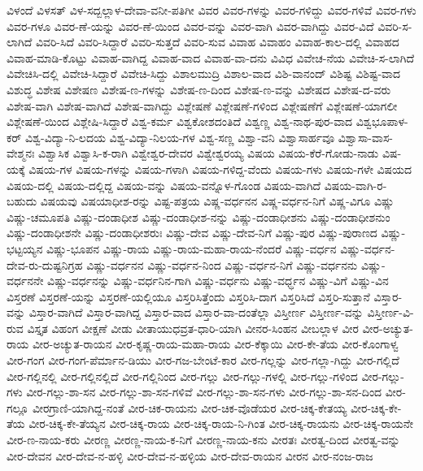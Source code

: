 {ವಿಳಂದೆ
ವಿಳಸತ್
ವಿಳ-ಸದ್ಬಲ್ಲಾಳ-ದೇವಾ-ವನೀ-ಪತಿಗೀ
ವಿವರ
ವಿವರ-ಗಳನ್ನು
ವಿವರ-ಗಳಿದ್ದು
ವಿವರ-ಗಳಿವೆ
ವಿವರ-ಗಳು
ವಿವರ-ಗಳೂ
ವಿವರ-ಣೆ-ಯನ್ನು
ವಿವರ-ಣೆ-ಯಿಂದ
ವಿವರ-ವನ್ನು
ವಿವರ-ವಾಗಿ
ವಿವರ-ವಾಗಿದ್ದು
ವಿವರ-ವಿದೆ
ವಿವರಿ-ಸ-ಲಾಗಿದೆ
ವಿವರಿ-ಸಿದೆ
ವಿವರಿ-ಸಿದ್ದಾರೆ
ವಿವರಿ-ಸುತ್ತದೆ
ವಿವರಿ-ಸುವ
ವಿವಾಹ
ವಿವಾಹಂ
ವಿವಾಹ-ಕಾಲ-ದಲ್ಲಿ
ವಿವಾಹದ
ವಿವಾಹ-ಮಾಡಿ-ಕೊಟ್ಟು
ವಿವಾಹ-ವಾಗಿದ್ದ
ವಿವಾಹ-ವಾದ
ವಿವಾಹ-ವಾ-ದನು
ವಿವಿಧ
ವಿವೇಚ-ನೆಯ
ವಿವೇಚಿ-ಸ-ಲಾಗಿದೆ
ವಿವೇಚಿಸಿ-ದಲ್ಲಿ
ವಿವೇಚಿ-ಸಿದ್ದಾರೆ
ವಿವೇಚಿ-ಸಿದ್ದು
ವಿಶಾಲಮುದ್ರಿ
ವಿಶಾಲ-ವಾದ
ವಿಶಿ-ವಾನಂದ್
ವಿಶಿಷ್ಟ
ವಿಶಿಷ್ಟ-ವಾದ
ವಿಶುದ್ಧ
ವಿಶೇಷ
ವಿಶೇಷಣ
ವಿಶೇಷ-ಣ-ಗಳನ್ನು
ವಿಶೇಷ-ಣ-ದಿಂದ
ವಿಶೇಷ-ಣ-ವನ್ನು
ವಿಶೇಷದ
ವಿಶೇಷ-ದ-ವರು
ವಿಶೇಷ-ವಾಗಿ
ವಿಶೇಷ-ವಾಗಿದೆ
ವಿಶೇಷ-ವಾಗಿದ್ದು
ವಿಶ್ಲೇಷಣೆ
ವಿಶ್ಲೇಷಣೆ-ಗಳಿಂದ
ವಿಶ್ಲೇಷಣೆಗೆ
ವಿಶ್ಲೇಷಣೆ-ಯಾಗಲೀ
ವಿಶ್ಲೇಷಣೆ-ಯಿಂದ
ವಿಶ್ಲೇಷಿ-ಸಿದ್ದಾರೆ
ವಿಶ್ವ-ಕರ್ಮ
ವಿಶ್ವಕೋಶದಂತಿದೆ
ವಿಶ್ವಣ್ಣ
ವಿಶ್ವ-ನಾಥ-ಪುರ-ವಾದ
ವಿಶ್ವಭೂಪಾಳ-ಕರ್
ವಿಶ್ವ-ವಿದ್ಯಾ-ನಿ-ಲದಯ
ವಿಶ್ವ-ವಿದ್ಯಾ-ನಿಲಯ-ಗಳ
ವಿಶ್ವ-ಸಣ್ಣ
ವಿಶ್ವಾ-ವನಿ
ವಿಶ್ವಾಸಾರ್ಹವೂ
ವಿಶ್ವಾಸಾ-ವಾಸ-ವೇಶ್ಮನಃ
ವಿಶ್ವಾಸಿಕ
ವಿಶ್ವಾಸಿ-ಕ-ರಾಗಿ
ವಿಶ್ವೇಶ್ವರ-ದೇವರ
ವಿಶ್ವೇಶ್ವರಯ್ಯ
ವಿಷಯ
ವಿಷಯ-ಕೆರೆ-ಗೋಡು-ನಾಡು
ವಿಷ-ಯಕ್ಕೆ
ವಿಷಯ-ಗಳ
ವಿಷಯ-ಗಳನ್ನು
ವಿಷಯ-ಗಳಾಗಿ
ವಿಷಯ-ಗಳಿದ್ದ-ವೆಂದು
ವಿಷಯ-ಗಳು
ವಿಷಯ-ಗಳೇ
ವಿಷಯದ
ವಿಷಯ-ದಲ್ಲಿ
ವಿಷಯ-ದಲ್ಲಿದ್ದ
ವಿಷಯ-ವನ್ನು
ವಿಷಯ-ವನ್ನೊಳ-ಗೊಂಡ
ವಿಷಯ-ವಾಗಿದೆ
ವಿಷಯ-ವಾಗಿ-ರ-ಬಹುದು
ವಿಷಯವು
ವಿಷಯಾಧೀಶ-ರನ್ನು
ವಿಷ್ಟ-ಪತ್ರಯ
ವಿಷ್ಣ-ವರ್ಧನನ
ವಿಷ್ಣ-ವರ್ಧನ-ನಿಗೆ
ವಿಷ್ಣ-ವಿಗೂ
ವಿಷ್ಣು
ವಿಷ್ಣು-ಚಮೂಪತಿ
ವಿಷ್ಣು-ದಂಡಾಧೀಶ
ವಿಷ್ಣು-ದಂಡಾಧೀಶ-ನನ್ನು
ವಿಷ್ಣು-ದಂಡಾಧೀಶನು
ವಿಷ್ಣು-ದಂಡಾಧೀಶನುಂ
ವಿಷ್ಣು-ದಂಡಾಧೀಶನೇ
ವಿಷ್ಣು-ದಂಡಾಧೀಶರುಃ
ವಿಷ್ಣು-ದೇವ
ವಿಷ್ಣು-ದೇವ-ನಿಗೆ
ವಿಷ್ಣು-ಪುರ
ವಿಷ್ಣು-ಪುರಾಣದ
ವಿಷ್ಣು-ಭಟ್ಟಯ್ಯನ
ವಿಷ್ಣು-ಭೂಪನ
ವಿಷ್ಣು-ರಾಯ
ವಿಷ್ಣು-ರಾಯ-ಮಹಾ-ರಾಯ-ನೆಂದರೆ
ವಿಷ್ಣು-ವರ್ಧನ
ವಿಷ್ಣು-ವರ್ಧನ-ದೇವ-ರು-ದುಷ್ಟನಿಗ್ರಹ
ವಿಷ್ಣು-ವರ್ಧನನ
ವಿಷ್ಣು-ವರ್ಧನ-ನಿಂದ
ವಿಷ್ಣು-ವರ್ಧನ-ನಿಗೆ
ವಿಷ್ಣು-ವರ್ಧನನು
ವಿಷ್ಣು-ವರ್ಧನನೇ
ವಿಷ್ಣು-ವರ್ಧನನ್ನು
ವಿಷ್ಣು-ವರ್ಧನಿನ-ಗಾಗಿ
ವಿಷ್ಣು-ವರ್ಧನು
ವಿಷ್ಣು-ವರ್ಧ್ಧನ
ವಿಷ್ಣು-ವಿಗೆ
ವಿಷ್ಣು-ವಿನ
ವಿಸ್ತರಣೆ
ವಿಸ್ತರಣೆ-ಯನ್ನು
ವಿಸ್ತರಣೆ-ಯಲ್ಲಿಯೂ
ವಿಸ್ತರಿಸಿತ್ತೆಂದು
ವಿಸ್ತರಿಸಿ-ದಾಗ
ವಿಸ್ತರಿಸಿದೆ
ವಿಸ್ತರಿ-ಸುತ್ತಾನೆ
ವಿಸ್ತಾರ-ವನ್ನು
ವಿಸ್ತಾರ-ವಾಗಿದೆ
ವಿಸ್ತಾರ-ವಾಗಿದ್ದ
ವಿಸ್ತಾರ-ವಾದ
ವಿಸ್ತಾರ-ವಾ-ದಂತೆಲ್ಲಾ
ವಿಸ್ತೀರ್ಣ
ವಿಸ್ತೀರ್ಣ-ವನ್ನು
ವಿಸ್ತೀರ್ಣ-ವಿ-ರುವ
ವಿಸ್ತೃತ
ವಿಹಂಗ
ವೀಕ್ಷಣೆ
ವೀಡು
ವೀತಾಯುಧವ್ರತ-ಧಾರಿ-ಯಾಗಿ
ವೀನರ-ಸಿಂಹನ
ವೀಬಲ್ಲಾಳ
ವೀರ
ವೀರ-ಅಚ್ಯುತ-ರಾಯ
ವೀರ-ಅಚ್ಯುತ-ರಾಯನ
ವೀರ-ಕೃಷ್ಣ-ರಾಯ-ಮಹಾ-ರಾಯ
ವೀರ-ಕೆಕ್ಕಾಯಿ
ವೀರ-ಕೇ-ತೆಯ
ವೀರ-ಕೊಂಗಾಳ್ವ
ವೀರ-ಗಂಗ
ವೀರ-ಗಂಗ-ಪೆರ್ಮಾನ-ಡಿಯು
ವೀರ-ಗಜ-ಬೇಂಟೆ-ಕಾರ
ವೀರ-ಗಲ್ಲನ್ನು
ವೀರ-ಗಲ್ಲಾ-ಗಿದ್ದು
ವೀರ-ಗಲ್ಲಿದೆ
ವೀರ-ಗಲ್ಲಿನಲ್ಲಿ
ವೀರ-ಗಲ್ಲಿನಲ್ಲಿದೆ
ವೀರ-ಗಲ್ಲಿನಿಂದ
ವೀರ-ಗಲ್ಲು
ವೀರ-ಗಲ್ಲು-ಗಳಲ್ಲಿ
ವೀರ-ಗಲ್ಲು-ಗಳಿಂದ
ವೀರ-ಗಲ್ಲು-ಗಳು
ವೀರ-ಗಲ್ಲು-ಶಾ-ಸನ
ವೀರ-ಗಲ್ಲು-ಶಾ-ಸನ-ಗಳಿವೆ
ವೀರ-ಗಲ್ಲು-ಶಾ-ಸನ-ಗಳು
ವೀರ-ಗಲ್ಲು-ಶಾ-ಸನ-ದಿಂದ
ವೀರ-ಗಲ್ಲೂ
ವೀರಗ್ರಾಣಿ-ಯಾಗಿದ್ದ-ನಂತೆ
ವೀರ-ಚಿಕ-ರಾಯನು
ವೀರ-ಚಿಕ-ವೊಡೆಯರ
ವೀರ-ಚಿಕ್ಕ-ಕೇತಯ್ಯ
ವೀರ-ಚಿಕ್ಕ-ಕೇ-ತೆಯ
ವೀರ-ಚಿಕ್ಕ-ಕೇ-ತೆಯ್ಯನ
ವೀರ-ಚಿಕ್ಕ-ರಾಯ
ವೀರ-ಚಿಕ್ಕ-ರಾಯ-ನಿ-ಗಿಂತ
ವೀರ-ಚಿಕ್ಕ-ರಾಯನು
ವೀರ-ಚಿಕ್ಕ-ರಾಯನೇ
ವೀರ-ಣ-ನಾಯ-ಕರು
ವೀರಣ್ಣ
ವೀರಣ್ಣ-ನಾಯ-ಕ-ನಿಗೆ
ವೀರಣ್ಣ-ನಾಯ-ಕನು
ವೀರತಃ
ವೀರತ್ವ-ದಿಂದ
ವೀರತ್ವ-ವನ್ನು
ವೀರ-ದೇವನ
ವೀರ-ದೇವ-ನ-ಹಳ್ಳಿ
ವೀರ-ದೇವ-ನ-ಹಳ್ಳಿಯ
ವೀರ-ದೇವ-ರಾಯನ
ವೀರನ
ವೀರ-ನಂಜ-ರಾಜ
}
